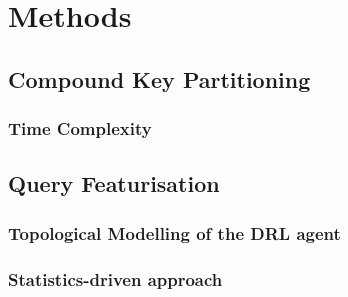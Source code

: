 \chapter{Methods}
\label{Methods}
\section{Compound Key Partitioning}

\subsection{Time Complexity}

\section{Query Featurisation}

\subsection{Topological Modelling of the DRL agent}

\subsection{Statistics-driven approach}
